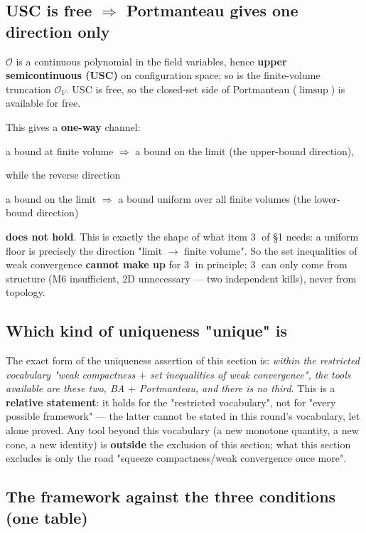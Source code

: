 \documentclass[11pt,a4paper]{article}
\newcommand{\lvR}{\textcolor{cC}{\textbf{relative statement}}}
\begin{document}
\subsection{USC is free $\Rightarrow$ Portmanteau gives one direction only}

$\mathcal{O}$ is a continuous polynomial in the field variables, hence \textbf{upper semicontinuous (USC)} on configuration space; so is the finite-volume truncation $\mathcal{O}_V$. USC is free, so the closed-set side of Portmanteau ($\limsup$) is available for free.

This gives a \textbf{one-way} channel:
\begin{center}
a bound at finite volume \;$\Longrightarrow$\; a bound on the limit \quad (the upper-bound direction),
\end{center}
while the reverse direction
\begin{center}
a bound on the limit \;$\Longrightarrow$\; a bound uniform over all finite volumes \quad (the lower-bound direction)
\end{center}
\textbf{does not hold}. This is exactly the shape of what item \textcircled{\small3} of \S1 needs: a uniform floor is precisely the direction "limit $\to$ finite volume". So the set inequalities of weak convergence \textbf{cannot make up} for \textcircled{\small3} in principle; \textcircled{\small3} can only come from structure (M6 insufficient, 2D unnecessary --- two independent kills), never from topology.

\subsection{Which kind of uniqueness "unique" is}

The exact form of the uniqueness assertion of this section is: \emph{within the restricted vocabulary "weak compactness $+$ set inequalities of weak convergence", the tools available are these two, BA $+$ Portmanteau, and there is no third}. This is a \lvR: it holds for the "restricted vocabulary", not for "every possible framework" --- the latter cannot be stated in this round's vocabulary, let alone proved. Any tool beyond this vocabulary (a new monotone quantity, a new cone, a new identity) is \textbf{outside} the exclusion of this section; what this section excludes is only the road "squeeze compactness/weak convergence once more".

\subsection{The framework against the three conditions (one table)}
\end{document}
